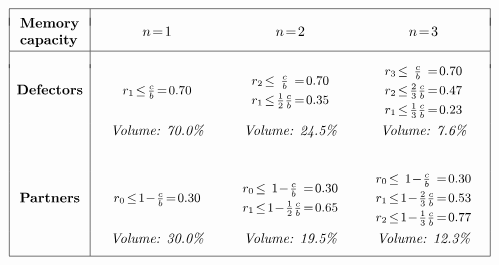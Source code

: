 \documentclass[9pt,twoside,lineno]{pnas-new}
\theoremstyle{plainCl1}
\theoremstyle{plainCl2}
\begin{document}
\begin{figure}[tbph]
\label{Tab:Volumes}
$$
\begin{array}{|c|ccc|}
\hline &&&\\[-0.2cm]
\parbox{1.5cm}{\textbf{\centering \noindent Memory capacity}}	&n\!=\!1	&n\!=\!2 &n\!=\!3\\[0.25cm]
\hline &&&\\[-0.1cm]

\textbf{Defectors}	
&\parbox[t]{3cm}{\centering\small \setlength{\arraycolsep}{0.2mm} $\begin{array}{ccccc} r_1&\le& \frac{c}{b}&=&0.70 \end{array}$}
&\parbox[t]{3cm}{\centering\small \setlength{\arraycolsep}{0.2mm} $\begin{array}{ccccc} r_2&\le& \frac{c}{b}&=&0.70\\[0.1cm] r_1 &\le &\frac{1}{2}\frac{c}{b} &= &0.35 \end{array}$}	
&\parbox[t]{3cm}{\centering\small \setlength{\arraycolsep}{0.2mm} $\begin{array}{ccccc} r_3&\le& \frac{c}{b}&=&0.70\\[0.1cm] r_2 &\le &\frac{2}{3}\frac{c}{b} &= &0.47\\[0.1cm]	r_1 &\le &\frac{1}{3}\frac{c}{b} &= &0.23 \end{array}$}\\[0.6cm]
&\textit{Volume: 70.0\%}	&\textit{Volume: 24.5\%}	&\textit{Volume: 7.6\%}\\[0.8cm]

\textbf{Partners}	
&\parbox{3cm}{\centering\small \setlength{\arraycolsep}{0.2mm} $\begin{array}{ccccc} r_0&\le& 1\!-\!\frac{c}{b}&=&0.30 \end{array}$}
&\parbox{3cm}{\centering\small \setlength{\arraycolsep}{0.2mm} $\begin{array}{ccccc} r_0&\le& 1\!-\!\frac{c}{b}&=&0.30\\[0.1cm] r_1&\le&1\!-\!\frac{1}{2}\frac{c}{b}&=&0.65 \end{array}$}
&\parbox{3cm}{\centering\small \setlength{\arraycolsep}{0.2mm} $\begin{array}{ccccc} r_0&\le& 1\!-\!\frac{c}{b}&=&0.30\\[0.1cm] r_1&\le&1\!-\!\frac{2}{3}\frac{c}{b}&=&0.53\\[0.1cm] r_2&\le&1\!-\!\frac{1}{3}\frac{c}{b}&=&0.77 \end{array}$}\\[0.6cm]
&\textit{Volume: 30.0\%}	&\textit{Volume: 19.5\%}	&\textit{Volume: 12.3\%}\\[0.2cm]
\hline
\end{array}
$$
\end{figure}
\end{document}
